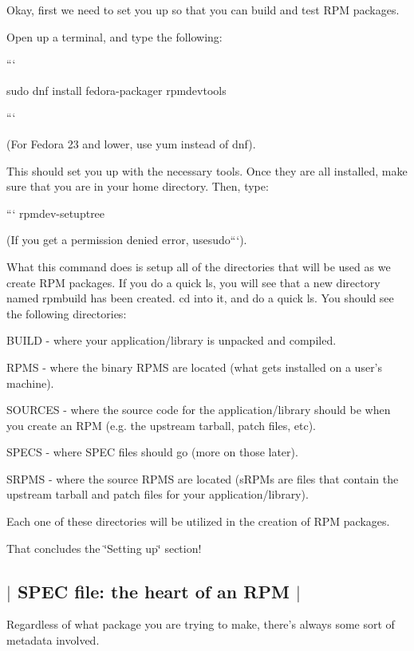 Okay, first we need to set you up so that you can build and test R\-P\-M packages.

Open up a terminal, and type the following\-:

```

sudo dnf install fedora-\/packager rpmdevtools

```

(For Fedora 23 and lower, use {\ttfamily yum} instead of {\ttfamily dnf}).

This should set you up with the necessary tools. Once they are all installed, make sure that you are in your home directory. Then, type\-:

``` rpmdev-\/setuptree

{\ttfamily  (If you get a permission denied error, use}sudo```).

What this command does is setup all of the directories that will be used as we create R\-P\-M packages. If you do a quick {\ttfamily ls}, you will see that a new directory named {\ttfamily rpmbuild} has been created. {\ttfamily cd} into it, and do a quick {\ttfamily ls}. You should see the following directories\-:

{\ttfamily B\-U\-I\-L\-D} -\/ where your application/library is unpacked and compiled.

{\ttfamily R\-P\-M\-S} -\/ where the binary R\-P\-M\-S are located (what gets installed on a user's machine).

{\ttfamily S\-O\-U\-R\-C\-E\-S} -\/ where the source code for the application/library should be when you create an R\-P\-M (e.\-g. the upstream tarball, patch files, etc).

{\ttfamily S\-P\-E\-C\-S} -\/ where S\-P\-E\-C files should go (more on those later).

{\ttfamily S\-R\-P\-M\-S} -\/ where the source R\-P\-M\-S are located (s\-R\-P\-Ms are files that contain the upstream tarball and patch files for your application/library).

Each one of these directories will be utilized in the creation of R\-P\-M packages.

That concludes the \char`\"{}\-Setting up\char`\"{} section! 

 \subsection*{$\vert$ S\-P\-E\-C file\-: the heart of an R\-P\-M $\vert$ }

Regardless of what package you are trying to make, there's always some sort of metadata involved.

